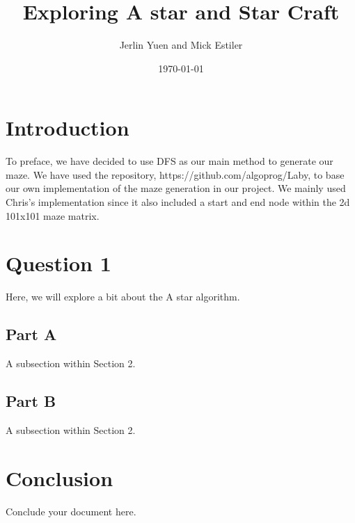 \documentclass{article}
\title{Exploring A star and Star Craft}
\author{Jerlin Yuen and Mick Estiler}
\date{\today} %
\begin{document}
\maketitle

\section{Introduction}
To preface, we have decided to use DFS as our main method to generate our maze. We have used the repository, https://github.com/algoprog/Laby, to base our own implementation of the maze generation in our project. We mainly used Chris's implementation since it also included a start and end node within the 2d 101x101 maze matrix.

\section{Question 1}
Here, we will explore a bit about the A star algorithm.

\subsection{Part A}
A subsection within Section 2.

\subsection{Part B}
A subsection within Section 2.

\section{Conclusion}
Conclude your document here.
\end{document}
